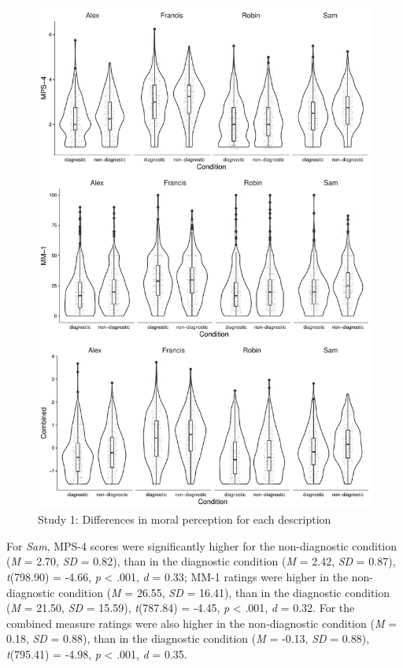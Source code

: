 \documentclass[
  american,
  man,mask,floatsintext]{apa6}
\begin{document}
\begin{figure}[!p]
\includegraphics{Supplementary_files/figure-latex/S1allscenariosPlot-1} \caption{Study 1: Differences in moral perception for each description}\label{fig:S1allscenariosPlot}
\end{figure}

For \emph{Sam}, MPS-4 scores were significantly higher for the non-diagnostic condition (\emph{M} = 2.70, \emph{SD} = 0.82), than in the diagnostic condition (\emph{M} = 2.42, \emph{SD} = 0.87), \emph{t}(798.90) = -4.66, \emph{p} \textless{} .001, \emph{d} = 0.33; MM-1 ratings were higher in the non-diagnostic condition (\emph{M} = 26.55, \emph{SD} = 16.41), than in the diagnostic condition (\emph{M} = 21.50, \emph{SD} = 15.59), \emph{t}(787.84) = -4.45, \emph{p} \textless{} .001, \emph{d} = 0.32. For the combined measure ratings were also higher in the non-diagnostic condition (\emph{M} = 0.18, \emph{SD} = 0.88), than in the diagnostic condition (\emph{M} = -0.13, \emph{SD} = 0.88), \emph{t}(795.41) = -4.98, \emph{p} \textless{} .001, \emph{d} = 0.35.
\end{document}
